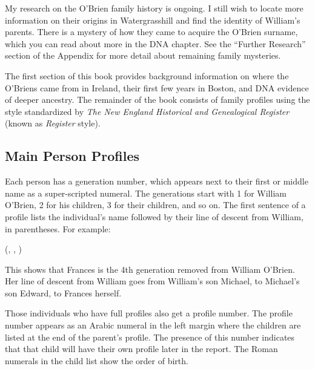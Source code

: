 My research on the O'Brien family history is ongoing. I still wish to locate more information on their origins in Watergrasshill and find the identity of William's parents. There is a mystery of how they came to acquire the O'Brien surname, which you can read about more in the DNA chapter. See the ``Further Research'' section of the Appendix for more detail about remaining family mysteries. 

The first section of this book provides background information on where the O'Briens came from in Ireland, their first few years in Boston, and DNA evidence of deeper ancestry. The remainder of the book consists of family profiles using the style standardized by \textit{The New England Historical and Genealogical Register} (known as \textit{Register} style). 

\subsection{Main Person Profiles}
	
Each person has a generation number, which appears next to their first or middle name as a super-scripted numeral. The generations start with 1 for William O'Brien, 2 for his children, 3 for their children, and so on. The first sentence of a profile lists the individual's name followed by their line of descent from William, in parentheses. For example:

\vspace{\baselineskip}
 (, , )
\vspace{\baselineskip}

This shows that Frances is the 4th generation removed from William O'Brien. Her line of descent from William goes from William's son Michael, to Michael's son Edward, to Frances herself.

Those individuals who have full profiles also get a profile number. The profile number appears as an Arabic numeral in the left margin where the children are listed at the end of the parent's profile. The presence of this number indicates that that child will have their own profile later in the report. The Roman numerals in the child list show the order of birth. 

